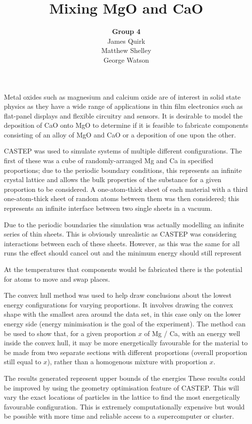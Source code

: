 \documentclass[a4paper,12pt]{article}
\title{Mixing MgO and CaO}
\author{\textbf{Group 4}\\
	James Quirk\\
	Matthew Shelley\\
	George Watson}
\date{}
\begin{document}
\begin{multicols}{2}
	\maketitle
	
	Metal oxides such as magnesium and calcium oxide are of interest in solid state physics as they have a wide range of applications in thin film electronics such as flat-panel displays and flexible circuitry and sensors.\cite{kim2011lowtemperature} It is desirable to model the deposition of CaO onto MgO to determine if it is feasible to fabricate components consisting of an alloy of MgO and CaO or a deposition of one upon the other.
	
	CASTEP\cite{clark2009first} was used to simulate systems of multiple different configurations. The first of these was a cube of randomly-arranged Mg and Ca in specified proportions; due to the periodic boundary conditions, this represents an infinite crystal lattice and allows the bulk properties of the substance for a given proportion to be considered. A one-atom-thick sheet of each material with a third one-atom-thick sheet of random atoms between them was then considered; this represents an infinite interface between two single sheets in a vacuum.
	
	Due to the periodic boundaries the simulation was actually modelling an infinite series of thin sheets. This is obviously unrealistic as CASTEP was considering interactions between each of these sheets. However, as this was the same for all runs the effect should cancel out and the minimum energy should still represent 
	
	At the temperatures that components would be fabricated there is the potential for atoms to move and swap places.
	
	The convex hull method\cite{jarvis1973identification} was used to help draw conclusions about the lowest energy configurations for varying proportions. It involves drawing the convex shape with the smallest area around the data set, in this case only on the lower energy side (energy minimisation is the goal of the experiment). The method can be used to show that, for a given proportion $x$ of Mg / Ca, with an energy well inside the convex hull, it may be more energetically favourable for the material to be made from two separate sections with different proportions (overall proportion still equal to $x$), rather than a homogenous mixture with proportion $x$.
	

	The results generated represent upper bounds of the energies These results could be improved by using the geometry optimisation feature of CASTEP. This will vary the exact locations of particles in the lattice to find the most energetically favourable configuration. This is extremely computationally expensive but would be possible with more time and reliable access to a supercomputer or cluster.
	


\end{multicols}
\end{document}
